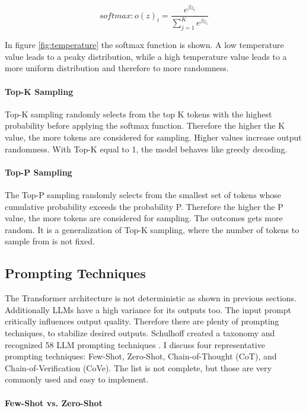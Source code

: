 $$softmax: o(z)_i = \frac{e^{\beta z_i}}{\sum_{j=1}^K e^{\beta z_i}}$$

In figure \ref{fig:temperature} the softmax function is shown. A low temperature value leads to a peaky distribution, while a high temperature value leads to a more uniform distribution and therefore to more randomness.


\paragraph{Top-K Sampling}
Top-K sampling \cite{Fan.13.05.2018} randomly selects from the top K tokens with the highest probability before applying the softmax function. Therefore the higher the K value, the more tokens are considered for sampling. Higher values increase output randomness. With Top-K equal to 1, the model behaves like greedy decoding.

\paragraph{Top-P Sampling}
The Top-P sampling \cite{Holtzman.22.04.2019} randomly selects from the smallest set of tokens whose cumulative probability exceeds the probability P. Therefore the higher the P value, the more tokens are considered for sampling. The outcomes gets more random. It is a generalization of Top-K sampling, where the number of tokens to sample from is not fixed.

\subsection{Prompting Techniques}
The Transformer architecture is not deterministic as shown in previous sections. Additionally LLMs have a high variance for its outputs too. The input prompt critically influences output quality. Therefore there are plenty of prompting techniques, to stabilize desired outputs. Schulhoff created a taxonomy and recognized 58 LLM prompting techniques \cite{Schulhoff.06.06.2024}. I discuss four representative prompting techniques: Few-Shot, Zero-Shot, Chain-of-Thought (CoT), and Chain-of-Verification (CoVe). The list is not complete, but those are very commonly used and easy to implement.

\paragraph{Few-Shot vs. Zero-Shot}

